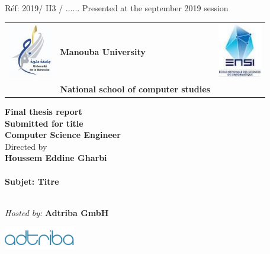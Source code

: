 

{\small
\emph\tiny{Réf: 2019/ II3 / ......}} 
\thispagestyle{empty}
\hspace{4.2cm}\small \emph\tiny{Presented at the september 2019 session}
\newline
\NRule
\begin{center}



\begin{tabular}{l >{\centering\arraybackslash}m{4in}l}
   \includegraphics[height=2.4cm]{images/manoubaUniversity} & %
  {\textbf{Manouba University}} & \includegraphics[height=2.4cm]{images/ensi.jpg} \\
  \textsc{\textbf{ }} &%
  {\textbf{National school of computer studies }} & \textsc{\textbf{ }} \\

\end{tabular}

\vspace*{1.5cm}
{ {\textbf{Final thesis report }}}\\[0.5cm]
{ {\textbf{Submitted for title}}}\\[0.5cm]
{ {\textbf{Computer Science Engineer}}}\\[1cm]

{\small {Directed by}}\\[0.7cm]
{\large\textbf{Houssem Eddine Gharbi}}\\[1cm]
\HRule \\[0.4cm]

{\large \bfseries Subjet: \textbf{Titre }\\[0.4cm] }
\HRule \\[1cm]

\begin{flushleft} 
  \emph{Hosted by:}\textbf{ Adtriba GmbH} \\
  \end{flushleft}
  \begin{center}
 \includegraphics[height=1cm]{images/adtriba.png} \\
\end{center}


\end{center}
